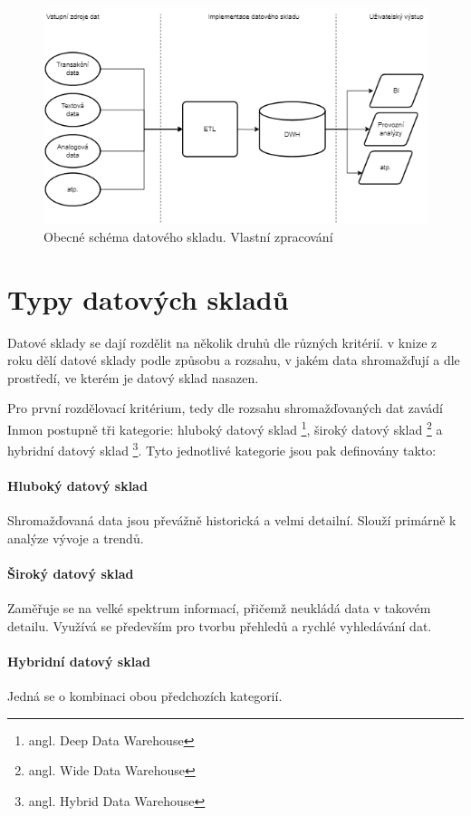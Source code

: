 \documentclass[
  digital,     %
  twoside,     %
  lof,         %
  lot,         %
]{fithesis4}
\begin{document}
\begin{figure}[h]
  \begin{center}
          \includegraphics[width=12cm]{img/dwh_schma.png}
  \end{center}
  \caption{Obecné schéma datového skladu. Vlastní zpracování}
  \label{fig:dwh_schema}
\end{figure}  


\section{Typy datových skladů}
\label{dwh_types}
Datové sklady se dají rozdělit na několik druhů dle různých kritérií. \citeauthor{Inmon2005}
v knize  z roku \citeyear{Inmon2005} dělí datové sklady podle způsobu a rozsahu,
v jakém data shromažďují a dle prostředí, ve kterém je datový sklad nasazen.

Pro první rozdělovací kritérium, tedy dle rozsahu shromažďovaných dat zavádí Inmon postupně tři kategorie: hluboký datový sklad \footnote{angl. Deep Data Warehouse}, široký datový sklad \footnote{angl. Wide Data Warehouse} a hybridní datový sklad \footnote{angl. Hybrid Data Warehouse}. Tyto jednotlivé kategorie jsou pak definovány takto:
\paragraph{Hluboký datový sklad}
Shromažďovaná data jsou převážně historická a velmi detailní. Slouží primárně k analýze vývoje a trendů.
\paragraph{Široký datový sklad}
Zaměřuje se na velké spektrum informací, přičemž neukládá data v takovém detailu. Využívá se především pro tvorbu přehledů a rychlé vyhledávání dat.
\paragraph{Hybridní datový sklad}
Jedná se o kombinaci obou předchozích kategorií.
\end{document}
